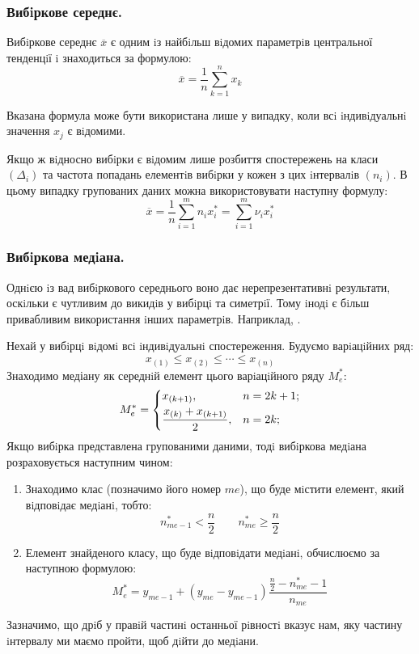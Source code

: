 \subsubsection{Вибiркове середнє.}
Вибiркове середнє $\overline{x}$ є одним iз найбiльш вiдомих параметрiв центральної тенденцiї i знаходиться за формулою:
$$
\overline{x} = \frac{1}{n}  \sum\limits_{k =1 }^{n}{x_k}
$$
\begin{remark}
    Вказана формула може бути використана лише у випадку, коли всi iндивiдуальнi значення $x_j$ є вiдомими.
\end{remark}
Якщо ж вiдносно вибiрки є вiдомим лише розбиття спостережень на класи $(\Delta_i)$ та частота
попадань елементiв вибiрки у кожен з цих iнтервалiв $(n_i)$. В цьому випадку групованих даних
можна використовувати наступну формулу:
$$
\overline{x} = \frac{1}{n}  \sum\limits_{i = 1}^{m}{n_i x_i^*} = \sum\limits_{i = 1}^{ m}{\nu_i x_i^*}
$$
\subsubsection{Вибiркова медiана.}
Однiєю iз вад вибiркового середнього воно дає нерепрезентативнi результати, оскiльки є
чутливим до викидiв у вибiрцi та симетрiї. Тому iнодi є бiльш привабливим використання iнших параметрiв. Наприклад, .\par
Нехай у вибiрцi вiдомi всi iндивiдуальнi спостереження. Будуємо варiацiйних ряд:
$$
x_{(1)} \leq x_{(2)} \leq \cdots \leq x_{(n)}
$$
Знаходимо медіану як середнiй елемент цього варiацiйного ряду $M_e^*$:
$$
M_e^* = \begin{dcases}
 x_{(k+1)}, & n = 2k+1;\\
 \frac{x_{(k)} + x_{(k+1)}}{2}, & n =2k;
\end{dcases}
$$
Якщо вибiрка представлена групованими даними, тодi вибiркова медiана розраховується
наступним чином:
\begin{enumerate}
    \item Знаходимо клас (позначимо його номер $me$), що буде мiстити елемент, який вiдповiдає медiанi, тобто:
    $$
    n^*_{me-1} < \frac{n}{2} \qquad n^*_{me} \geq  \frac{n}{2}
    $$
    \item Елемент знайденого класу, що буде вiдповiдати медiанi, обчислюємо за наступною формулою:
    $$
    M_e^* = y_{me-1} + (y_{me} - y_{me-1})    \frac{ \frac{n}{2} - n_{me}^* -1 }{n_{me}}
    $$
\end{enumerate}
Зазначимо, що дрiб у правiй частинi останньої рiвностi вказує нам, яку частину iнтервалу
ми маємо пройти, щоб дiйти до медiани.
